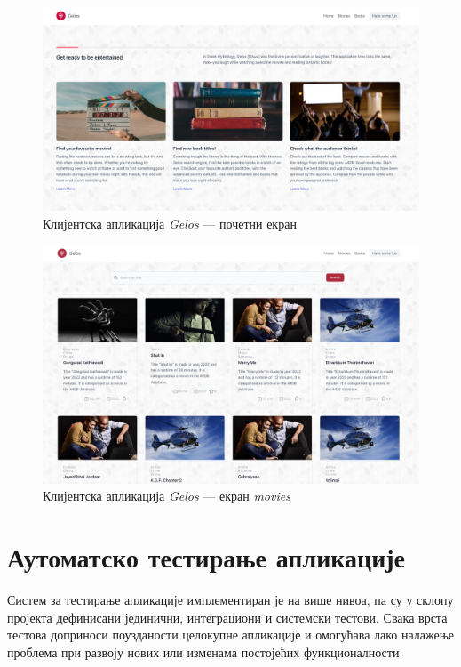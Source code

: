 \documentclass[12pt,oneside]{memoir}
\begin{document}
\begin{figure}[!ht]
  \centering
  \includegraphics[width=\textwidth]{matfmaster/img/client.png}
  \caption{Клијентска апликација \textit{Gelos} --- почетни екран}
  \label{fig:client}
\end{figure}
\begin{figure}[!ht]
  \centering
  \includegraphics[width=\textwidth]{matfmaster/img/moviesScreen.png}
  \caption{Клијентска апликација \textit{Gelos} --- екран \textit{movies}}
  \label{fig:client2}
\end{figure}


\newpage
\section{Аутоматско тестирање апликације}

Систем за тестирање апликације имплементиран је на више нивоа, па су у склопу пројекта дефинисани јединични, интеграциони и системски тестови. Свака врста тестова доприноси поузданости целокупне апликације и омогућава лако налажење проблема при развоју нових или изменама постојећих функционалности.
\end{document}
